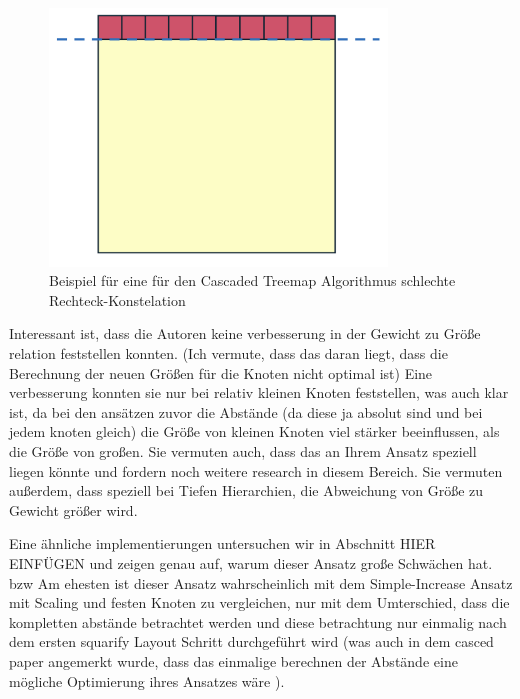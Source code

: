 \begin{figure}
    \centering
    \includegraphics[width=0.8\textwidth]{images/cascadedBadExample.png}
    \caption{Beispiel für eine für den Cascaded Treemap Algorithmus schlechte Rechteck-Konstelation}
    \label{fig:cascadedBadExample}
\end{figure}

Interessant ist, dass die Autoren keine verbesserung in der Gewicht zu Größe relation feststellen konnten. (Ich vermute, dass das daran liegt, dass die Berechnung der neuen Größen für die Knoten nicht optimal ist) 
Eine verbesserung konnten sie nur bei relativ kleinen Knoten feststellen, was auch klar ist, da bei den ansätzen zuvor die Abstände (da diese ja absolut sind und bei jedem knoten gleich) die Größe von kleinen Knoten viel stärker beeinflussen, als die Größe von großen. Sie vermuten auch, dass das an Ihrem Ansatz speziell liegen könnte und fordern noch weitere research in diesem Bereich.
Sie vermuten außerdem, dass speziell bei Tiefen Hierarchien, die Abweichung von Größe zu Gewicht größer wird.  

Eine ähnliche implementierungen untersuchen wir in Abschnitt HIER EINFÜGEN und zeigen genau auf, warum dieser Ansatz große Schwächen hat. bzw 
Am ehesten ist dieser Ansatz wahrscheinlich mit dem Simple-Increase Ansatz mit Scaling und festen Knoten zu vergleichen, nur mit dem Umterschied, dass die kompletten abstände betrachtet werden und diese betrachtung nur einmalig nach dem ersten squarify Layout Schritt durchgeführt wird (was auch in dem casced paper angemerkt wurde, dass das einmalige berechnen der Abstände eine mögliche Optimierung ihres Ansatzes wäre \cite[6]{lu2008cascaded}).





